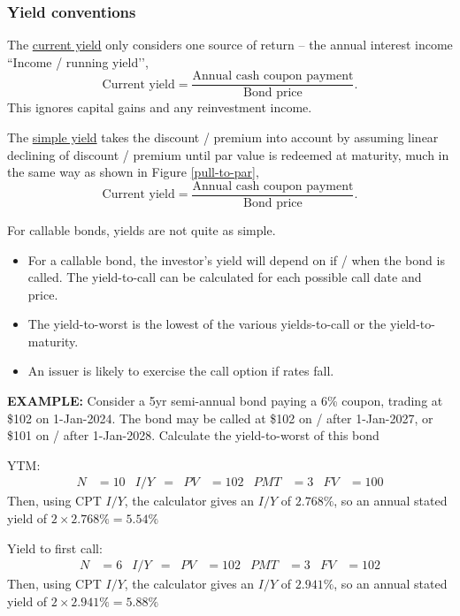 \documentclass[../notes_compiled.tex]{subfiles}
\begin{document}
\subsubsection{Yield conventions}
\begin{itemize}
\item The \underline{current yield} only considers one source of return -- the annual interest income ``Income / running yield’’,
\begin{equation}
\text{Current yield} = \frac{\text{Annual cash coupon payment}}{\text{Bond price}}.
\end{equation}
This ignores capital gains and any reinvestment income.
\item The \underline{simple yield} takes the discount / premium into account by assuming linear declining of discount / premium until par value is redeemed at maturity, much in the same way as shown in Figure \ref{pull-to-par},
\begin{equation}
\text{Current yield} = \frac{\text{Annual cash coupon payment}}{\text{Bond price}}.
\end{equation}
\item For callable bonds, yields are not quite as simple.
\begin{itemize}
\item For a callable bond, the investor’s yield will depend on if / when the bond is called. The yield-to-call can be calculated for each possible call date and price.
\item The yield-to-worst is the lowest of the various yields-to-call or the yield-to-maturity.
\item[] An issuer is likely to exercise the call option if rates fall.
\end{itemize}
{\color{RedViolet}
\item[] \textbf{EXAMPLE:} Consider a 5yr semi-annual bond paying a 6\% coupon, trading at \$102 on 1-Jan-2024. The bond may be called at \$102 on / after 1-Jan-2027, or \$101 on / after 1-Jan-2028. Calculate the yield-to-worst of this bond
}
{\color{RoyalBlue}
\item[] YTM:
\begin{align*}
N&=10  & I / Y &=  & PV &=102 & PMT &=3 & FV &= 100
\end{align*}
Then, using CPT $I / Y$, the calculator gives an $I / Y$ of $2.768\%$, so an annual stated yield of $2\times 2.768\% = 5.54\%$

\item[] Yield to first call:
\begin{align*}
N&=6  & I / Y &=  & PV &=102 & PMT &=3 & FV &= 102
\end{align*}
Then, using CPT $I / Y$, the calculator gives an $I / Y$ of $2.941\%$, so an annual stated yield of $2\times 2.941\% = 5.88\%$

}
\end{itemize}
\end{document}
